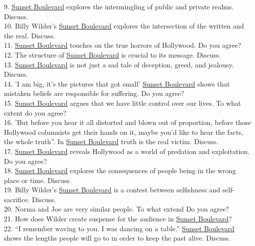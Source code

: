 \documentclass[a4paper]{article}
\begin{document}
9. \underline{Sunset Boulevard} explores the intermingling of public and private realms. Discuss.\\

10. Billy Wilder’s \underline{Sunset Boulevard} explores the intersection of the written and the real. Discuss.\\

11. \underline{Sunset Boulevard} touches on the true horrors of Hollywood. Do you agree?\\

12. The structure of \underline{Sunset Boulevard} is crucial to its message. Discuss.\\

13. \underline{Sunset Boulevard} is not just a sad tale of deception, greed, and jealousy. Discuss.\\

14. 'I am big, it's the pictures that got small' \underline{Sunset Boulevard} shows that mistaken beliefs are responsible for suffering. Do you agree?\\

15. \underline{Sunset Boulevard} argues that we have little control over our lives. To what extent do you agree?\\

16. 'But before you hear it all distorted and blown out of proportion, before those Hollywood columnists get their hands on it, maybe you'd like to hear the facts, the whole truth”. In \underline{Sunset Boulevard} truth is the real victim. Discuss.\\

17. \underline{Sunset Boulevard} reveals Hollywood as a world of predation and exploitation. Do you agree?\\

18. \underline{Sunset Boulevard} explores the consequences of people being in the wrong place or time. Discuss.\\

19. Billy Wilder’s \underline{Sunset Boulevard} is a contest between selfishness and self-sacrifice. Discuss.\\

20. Norma and Joe are very similar people. To what extend Do you agree?\\

21. How does Wilder create suspense for the audience in \underline{Sunset Boulevard}?\\

22. “I remember waving to you. I was dancing on a table.” \underline{Sunset Boulevard} shows the lengths people will go to in order to keep the past alive. Discuss.\\
\end{document}
